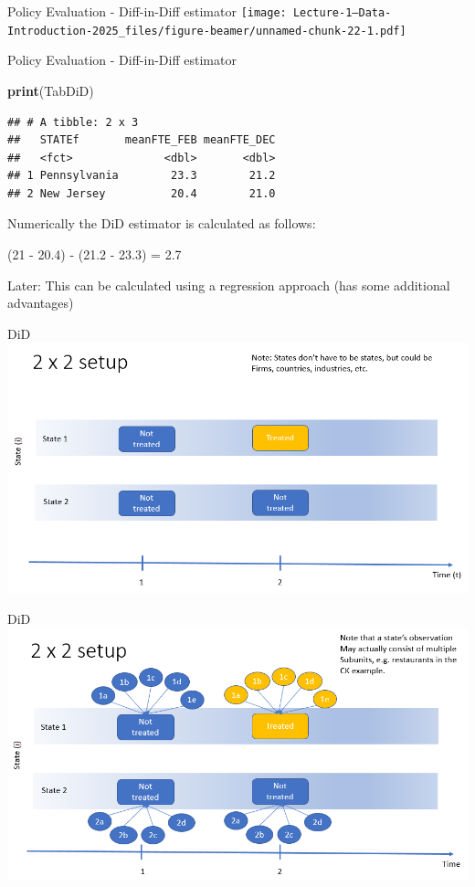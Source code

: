 \documentclass[
  ignorenonframetext,
]{beamer}
\newenvironment{Shaded}{\begin{snugshade}}{\end{snugshade}}
\newcommand{\FunctionTok}[1]{\textcolor[rgb]{0.13,0.29,0.53}{\textbf{#1}}}
\newcommand{\NormalTok}[1]{#1}
\begin{document}
\begin{frame}{Policy Evaluation - Diff-in-Diff estimator}
\label{policy-evaluation---diff-in-diff-estimator}
\texttt{[image: Lecture-1---Data-Introduction-2025\_files/figure-beamer/unnamed-chunk-22-1.pdf]}
\end{frame}

\begin{frame}[fragile]{Policy Evaluation - Diff-in-Diff estimator}
\label{policy-evaluation---diff-in-diff-estimator-1}
\begin{Shaded}
\begin{Highlighting}[]
\FunctionTok{print}\NormalTok{(TabDiD)}
\end{Highlighting}
\end{Shaded}

\begin{verbatim}
## # A tibble: 2 x 3
##   STATEf       meanFTE_FEB meanFTE_DEC
##   <fct>              <dbl>       <dbl>
## 1 Pennsylvania        23.3        21.2
## 2 New Jersey          20.4        21.0
\end{verbatim}

Numerically the DiD estimator is calculated as follows:

(21 - 20.4) - (21.2 - 23.3) = 2.7

Later: This can be calculated using a regression approach (has some
additional advantages)
\end{frame}

\begin{frame}{DiD}
\label{did}
\includegraphics{2x2slide1.PNG}
\end{frame}

\begin{frame}{DiD}
\label{did-1}
\includegraphics{2x2slide2.PNG}
\end{frame}
\end{document}
